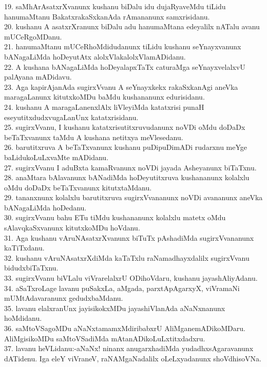 \documentclass{article}
\begin{document}
19. saMhArAsatxrXvanunx kushanu biDalu idu dujaRyaveMdu tiLidu hanumaMtanu BakatxrakaSxkanAda rAmananunx samxrisidanu.\\
20. kushanu A asatxrXranunx biDalu adu hanumaMtana edeyalilx nATalu avanu mUCeRgoMDanu.\\
21. hanumaMtanu mUCeRhoMdidudanunx tiLidu kushanu seYnayxvanunx bANagaLiMda hoDeyutAtx alolxVlakalolxVlamADidanu.\\
22. A kushana bANagaLiMda hoDeyalapxTaTx caturaMga seYnayxvelalxvU palAyana mADidavu.\\
23. Aga kapirAjanAda sugirxVvanu A seYnayxkekx rakaSxkanAgi aneVka maragaLanunx kitutxkoMDu baMdu kushananunx edurisidanu.\\
24. kushanu A maragaLanenxlAlx liVleyiMda katatxrisi punaH eseyutitxdudxvugaLanUnx katatxrisidanu.\\
25. sugirxVvanu, I kushanu katatxrisutitxruvudanunx noVDi oMdu doDaDx beTaTxvanunx taMdu A kushana netitxya meVlesedanu.\\
26. barutitxruva A beTaTxvanunx kushanu puDipuDimADi rudarxnu meYge baLidukoLuLxvaMte mADidanu.\\
27. sugirxVvanu I aduBxta kamaRvanunx noVDi jayada Asheyanunx biTaTxnu.\\
28. anaMtara bAlavanunx bANadiMda hoDeyutitxruva kushananunx kolalxlu oMdu doDaDx beTaTxvanunx kitutxtaMdanu.\\
29. tananxnunx kolalxlu barutitxruva sugirxVvananunx noVDi avananunx aneVka bANagaLiMda hoDedanu.\\
30. sugirxVvanu bahu ETu tiMdu kushananunx kolalxlu matetx oMdu sAlavqkaSxvanunx kitutxkoMDu hoVdanu.\\
31. Aga kushanu vAruNAsatxrXvanunx biTuTx pAshadiMda sugirxVvananunx kaTiTxdanu.\\
32. kushanu vAruNAsatxrXdiMda kaTaTxlu raNamadhayxdalilx sugirxVvanu bidudxbiTaTxnu.\\
33. sugirxVvanu biVLalu viVrarelalxrU ODihoVdaru, kushanu jayashAliyAdanu.\\
34. aSaTxroLage lavanu puSakxLa, aMgada, parxtApAgarxyX, viVramaNi mUMtAdavaranunx gedudxbaMdanu.\\
35. lavanu elalxranUnx jayisikokxMDu jayashiVlanAda aNaNxnanunx hoMdidanu.\\
36. saMtoVSagoMDu aNaNxtamamxMdiribabxrU AliMganemADikoMDaru. AliMgisikoMDu saMtoVSadiMda mAtanADikoLuLxtitxdadxru.\\
37. lavanu heVLidanu:-aNaNx! ninanx anugarxhadiMda yudadhxsAgaravanunx dATidenu. Iga eleY viVraneV, raNAMgaNadalilx oLeLxyadanunx shoVdhisoVNa.\\
\end{document}
